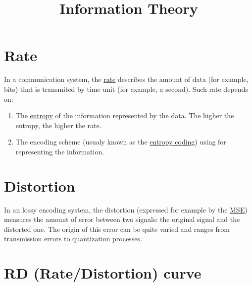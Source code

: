 
\title{Information Theory}
\maketitle

\tableofcontents

\section{Rate}

In a communication system, the
\href{https://en.wikipedia.org/wiki/Bit_rate}{rate} describes the
amount of data (for example, bits) that is transmited by time unit
(for example, a second). Such rate depends on:
\begin{enumerate}
\item The
  \href{https://en.wikipedia.org/wiki/Entropy_(information_theory)}{entropy}
  of the information represented by the data. The higher the entropy,
  the higher the rate.
\item The encoding scheme (usualy known as the
  \href{https://en.wikipedia.org/wiki/Entropy_coding}{entropy coding})
  using for representing the information.
\end{enumerate}

\section{Distortion}

In an lossy encoding system, the distortion (expressed for example by
the \href{https://en.wikipedia.org/wiki/Mean_squared_error}{MSE})
measures the amount of error between two signals: the original signal
and the distorted one. The origin of this error can be quite varied
and ranges from transmission errors to quantization processes.

\section{RD (Rate/Distortion) curve}

